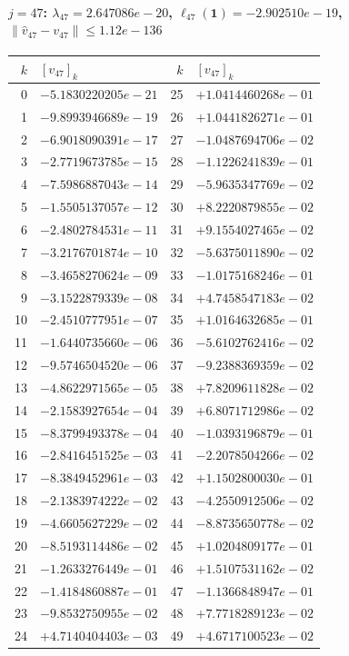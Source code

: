 \documentclass[11pt]{article}
\begin{document}
\paragraph{$j = 47$: $\lambda_{47} = 2.647086e-20$, \quad $\ell_{47}(\mathbf{1}) = -2.902510e-19$, \quad $\|\hat v_{47} - v_{47}\| \leq 1.12e-136$}
\begin{center}
{\footnotesize
\begin{tabular}{r@{\;\;}l@{\quad}r@{\;\;}l}
\toprule
$k$ & $[v_{47}]_k$ & $k$ & $[v_{47}]_k$ \\
\midrule
0 & $-5.1830220205e-21$ & 25 & $+1.0414460268e-01$ \\
1 & $-9.8993946689e-19$ & 26 & $+1.0441826271e-01$ \\
2 & $-6.9018090391e-17$ & 27 & $-1.0487694706e-02$ \\
3 & $-2.7719673785e-15$ & 28 & $-1.1226241839e-01$ \\
4 & $-7.5986887043e-14$ & 29 & $-5.9635347769e-02$ \\
5 & $-1.5505137057e-12$ & 30 & $+8.2220879855e-02$ \\
6 & $-2.4802784531e-11$ & 31 & $+9.1554027465e-02$ \\
7 & $-3.2176701874e-10$ & 32 & $-5.6375011890e-02$ \\
8 & $-3.4658270624e-09$ & 33 & $-1.0175168246e-01$ \\
9 & $-3.1522879339e-08$ & 34 & $+4.7458547183e-02$ \\
10 & $-2.4510777951e-07$ & 35 & $+1.0164632685e-01$ \\
11 & $-1.6440735660e-06$ & 36 & $-5.6102762416e-02$ \\
12 & $-9.5746504520e-06$ & 37 & $-9.2388369359e-02$ \\
13 & $-4.8622971565e-05$ & 38 & $+7.8209611828e-02$ \\
14 & $-2.1583927654e-04$ & 39 & $+6.8071712986e-02$ \\
15 & $-8.3799493378e-04$ & 40 & $-1.0393196879e-01$ \\
16 & $-2.8416451525e-03$ & 41 & $-2.2078504266e-02$ \\
17 & $-8.3849452961e-03$ & 42 & $+1.1502800030e-01$ \\
18 & $-2.1383974222e-02$ & 43 & $-4.2550912506e-02$ \\
19 & $-4.6605627229e-02$ & 44 & $-8.8735650778e-02$ \\
20 & $-8.5193114486e-02$ & 45 & $+1.0204809177e-01$ \\
21 & $-1.2633276449e-01$ & 46 & $+1.5107531162e-02$ \\
22 & $-1.4184860887e-01$ & 47 & $-1.1366848947e-01$ \\
23 & $-9.8532750955e-02$ & 48 & $+7.7718289123e-02$ \\
24 & $+4.7140404403e-03$ & 49 & $+4.6717100523e-02$ \\
\bottomrule
\end{tabular}
}
\end{center}
\end{document}
